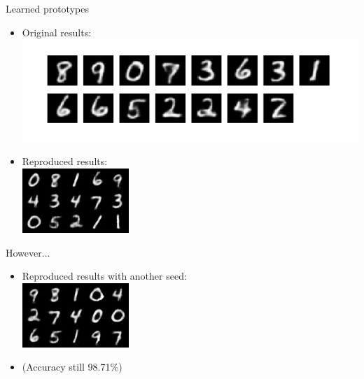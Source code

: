 \documentclass{beamer}[169]
\begin{document}
\begin{frame}{Learned prototypes}
\begin{itemize}
\item Original results:\\
\includegraphics[scale=0.4]{img/originals.png}\pause
\item Reproduced results:\\
\includegraphics[scale=0.9]{img/reproduced42.png}
\end{itemize}
\end{frame}

\begin{frame}{However...}
\begin{itemize} 
\item Reproduced results with another seed:\\

\includegraphics[scale=0.9]{img/reproduced9.png}

\item (Accuracy still 98.71\%)
\end{itemize}
\end{frame}
\end{document}
